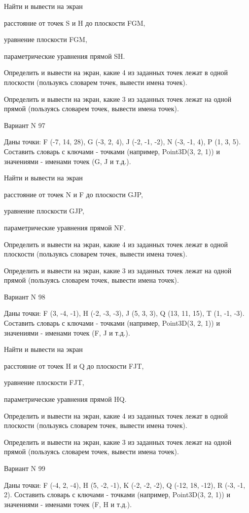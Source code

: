 \documentclass[11pt]{report}
\begin{document}
Найти и вывести на экран


расстояние от точек S и H до плоскости FGM,


уравнение плоскости FGM,


параметрические уравнения прямой SH.


Определить и вывести на экран, какие 4 из заданных точек лежат в одной плоскости (пользуясь словарем точек, вывести имена точек).


Определить и вывести на экран, какие 3 из заданных точек лежат на одной прямой (пользуясь словарем точек, вывести имена точек).

\newpage
Вариант N 97

Даны точки: F (-7, 14, 28), G (-3, 2, 4), J (-2, -1, -2), N (-3, -1, 4), P (1, 3, 5).
Составить словарь с ключами - точками (например, Point3D(3, 2, 1)) и значениями - именами точек (G, J и т.д.).


Найти и вывести на экран


расстояние от точек N и F до плоскости GJP,


уравнение плоскости GJP,


параметрические уравнения прямой NF.


Определить и вывести на экран, какие 4 из заданных точек лежат в одной плоскости (пользуясь словарем точек, вывести имена точек).


Определить и вывести на экран, какие 3 из заданных точек лежат на одной прямой (пользуясь словарем точек, вывести имена точек).

\newpage
Вариант N 98

Даны точки: F (3, -4, -1), H (-2, -3, -3), J (5, 3, 3), Q (13, 11, 15), T (1, -1, -3).
Составить словарь с ключами - точками (например, Point3D(3, 2, 1)) и значениями - именами точек (F, J и т.д.).


Найти и вывести на экран


расстояние от точек H и Q до плоскости FJT,


уравнение плоскости FJT,


параметрические уравнения прямой HQ.


Определить и вывести на экран, какие 4 из заданных точек лежат в одной плоскости (пользуясь словарем точек, вывести имена точек).


Определить и вывести на экран, какие 3 из заданных точек лежат на одной прямой (пользуясь словарем точек, вывести имена точек).

\newpage
Вариант N 99

Даны точки: F (-4, 2, -4), H (5, -2, -1), K (-2, -2, -2), Q (-12, 18, -12), R (-3, -1, 2).
Составить словарь с ключами - точками (например, Point3D(3, 2, 1)) и значениями - именами точек (F, H и т.д.).
\end{document}
